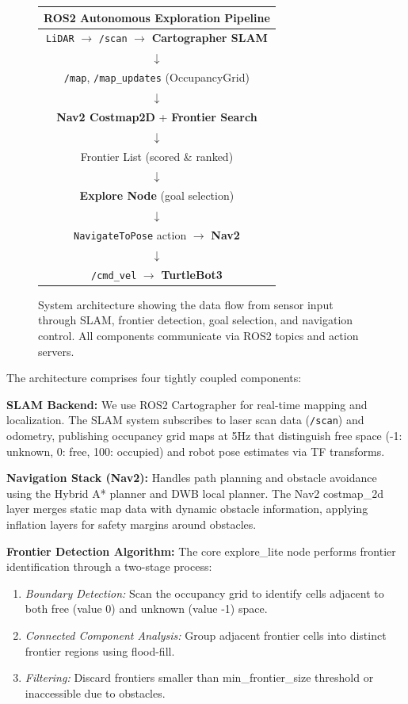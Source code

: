 \documentclass[conference]{IEEEtran}
\begin{document}
\begin{figure}[h]
\centering
\small
\begin{tabular}{c}
\textbf{ROS2 Autonomous Exploration Pipeline} \\[0.5em]
\hline
\texttt{LiDAR} $\rightarrow$ \texttt{/scan} $\rightarrow$ \textbf{Cartographer SLAM} \\
$\downarrow$ \\
\texttt{/map}, \texttt{/map\_updates} (OccupancyGrid) \\
$\downarrow$ \\
\textbf{Nav2 Costmap2D} + \textbf{Frontier Search} \\
$\downarrow$ \\
Frontier List (scored \& ranked) \\
$\downarrow$ \\
\textbf{Explore Node} (goal selection) \\
$\downarrow$ \\
\texttt{NavigateToPose} action $\rightarrow$ \textbf{Nav2} \\
$\downarrow$ \\
\texttt{/cmd\_vel} $\rightarrow$ \textbf{TurtleBot3} \\
\hline
\end{tabular}
\caption{System architecture showing the data flow from sensor input through SLAM, frontier detection, goal selection, and navigation control. All components communicate via ROS2 topics and action servers.}
\label{fig:architecture}
\end{figure}

The architecture comprises four tightly coupled components:

\textbf{SLAM Backend:} We use ROS2 Cartographer for real-time mapping and localization. The SLAM system subscribes to laser scan data (\texttt{/scan}) and odometry, publishing occupancy grid maps at 5Hz that distinguish free space (-1: unknown, 0: free, 100: occupied) and robot pose estimates via TF transforms.

\textbf{Navigation Stack (Nav2):} Handles path planning and obstacle avoidance using the Hybrid A* planner and DWB local planner. The Nav2 costmap\_2d layer merges static map data with dynamic obstacle information, applying inflation layers for safety margins around obstacles.

\textbf{Frontier Detection Algorithm:} The core explore\_lite node performs frontier identification through a two-stage process:
\begin{enumerate}
    \item \textit{Boundary Detection:} Scan the occupancy grid to identify cells adjacent to both free (value 0) and unknown (value -1) space.
    \item \textit{Connected Component Analysis:} Group adjacent frontier cells into distinct frontier regions using flood-fill.
    \item \textit{Filtering:} Discard frontiers smaller than min\_frontier\_size threshold or inaccessible due to obstacles.
\end{enumerate}
\end{document}
